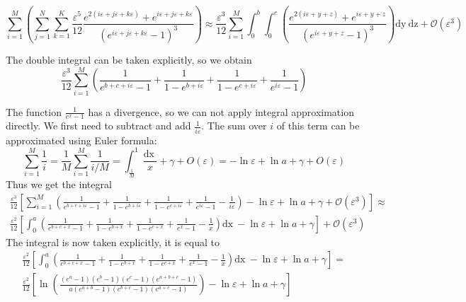 \documentclass{article}
\newcommand{\dx}{\mathrm{dx}~}
\newcommand{\dy}{\mathrm{dy}~}
\newcommand{\dz}{\mathrm{dz}}
\begin{document}
\begin{equation}
  \label{eq:9}
\sum_{i=1}^{M}\left(\sum_{j=1}^{N}\sum_{k=1}^{K}\frac{\varepsilon^{5}}{12}
      \frac{e^{2(i\varepsilon+j\varepsilon+k\varepsilon)}+e^{i\varepsilon+j\varepsilon+k\varepsilon}}{\left(e^{i\varepsilon+j\varepsilon+k\varepsilon}-1\right)^{3}}  \right)\approx
    \frac{\varepsilon^{3}}{12}\sum_{i=1}^{M} \int_{0}^{b}\int_{0}^{c}
      \left(\frac{e^{2(i\varepsilon+y+z)}+e^{i\varepsilon+y+z}}{\left(e^{i\varepsilon+y+z}-1\right)^{3}}\right) \dy \dz+\mathcal{O}(\varepsilon^{3})
\end{equation}

The double integral can be taken explicitly, so we obtain
\begin{equation}
  \label{eq:11}
  \frac{\varepsilon^{3}}{12}\sum_{i=1}^{M}\left(     \frac{1}{e^{b+c+i\varepsilon}-1}+
  \frac{1}{1-e^{b+i\varepsilon}}+\frac{1}{1-e^{c+i\varepsilon}}+\frac{1}{e^{i\varepsilon}-1}\right)
\end{equation}

The function $\frac{1}{e^{x}-1}$ has a divergence, so we can not apply integral approximation directly. We first need to 
subtract and add $\frac{1}{i\varepsilon}$. The sum over $i$ of this term can be approximated using Euler formula:
\begin{equation}
    \label{eq:24}
    \sum_{i=1}^{M}\frac{1}{i}=\frac{1}{M}\sum_{i=1}^{M}\frac{1}{i/M}=\int_{\frac{1}{M}}^{1}\frac{\dx}{x}+\gamma+O(\varepsilon)=-\ln\varepsilon+\ln a+\gamma+O(\varepsilon)
  \end{equation}
Thus we get the integral %
\begin{multline}
  \label{eq:13}
    \frac{\varepsilon^{3}}{12}\left[\sum_{i=1}^{M}\left(     \frac{1}{e^{b+c+i\varepsilon}-1}+
      \frac{1}{1-e^{b+i\varepsilon}}+\frac{1}{1-e^{c+i\varepsilon}}+\frac{1}{e^{i\varepsilon}-1}-\frac{1}{i\varepsilon}\right)-\ln\varepsilon+\ln a+\gamma+\mathcal{O}(\varepsilon^{3})\right]\approx\\
   \frac{\varepsilon^{2}}{12}\left[\int_{0}^{a}\left(     \frac{1}{e^{b+c+x}-1}+
      \frac{1}{1-e^{b+x}}+\frac{1}{1-e^{c+x}}+\frac{1}{e^{x}-1}-\frac{1}{x}\right)\dx-\ln\varepsilon+\ln a+\gamma\right]+\mathcal{O}(\varepsilon^{3})    
\end{multline}
The integral is now taken explicitly, it is equal to
\begin{multline}
  \label{eq:22}
     \frac{\varepsilon^{2}}{12}\left[\int_{0}^{a}\left(     \frac{1}{e^{b+c+x}-1}+
         \frac{1}{1-e^{b+x}}+\frac{1}{1-e^{c+x}}+\frac{1}{e^{x}-1}-\frac{1}{x}\right)\dx-\ln\varepsilon+\ln a+\gamma\right]=\\
     \frac{\varepsilon^{2}}{12}\left[\ln \left(\frac{(e^{a}-1)(e^{b}-1)(e^{c}-1)(e^{a+b+c}-1)}{a (e^{a+b}-1)(e^{b+c}-1)(e^{a+c}-1)}\right)-\ln\varepsilon+\ln a+\gamma\right]
\end{multline}
\end{document}
